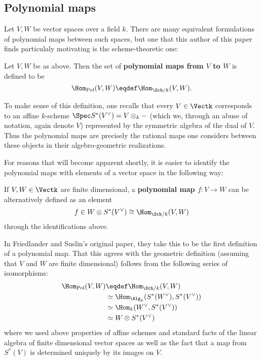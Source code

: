 \documentclass[12pt]{article}
\begin{document}
\subsection{Polynomial maps}
Let $V,W$ be vector spaces over a field $k$. There are many equivalent formulations of polynomial maps between such spaces, 
but one that this author of this paper finds particulaly motivating is the scheme-theoretic one:
\begin{defn}\label{defn:poly-maps}
	Let $V,W$ be as above. Then the set of \textbf{polynomial maps from $V$ to $W$} is defined to be 
	\[\Hom_\text{Pol}(V,W)\eqdef \Hom_{\Sch/k}(V,W).\]
\end{defn}

To make sense of this definition, one recalls that every $V\in\Vectk$ corresponds to an affine $k$-scheme 
$\Spec S^\ast(V^\vee)=V\otimes_k-$ (which we, through an abuse of notation, again denote $V$) represented by the symmetric algebra of the dual of $V$. Thus the polynomial maps
are precisely the rational maps one considers between these objects in their algebro-geometric realizations.

For reasons that will become apparent shortly, it is easier to identify the polynomial maps with elements of a vector space in the following way:
\begin{defn}
	If $V,W\in\Vectk$ are finite dimensional, a \textbf{polynomial map $f:V\to W$} can be alternatively defined as an element 
	\[f\in W\otimes S^\ast(V^\vee)\cong\Hom_{\Sch/k}(V,W)\]
	through the identifications above.
\end{defn}
\begin{rmk}
	In Friedlander and Suslin's original paper, they take this to be the first definition of a polynomial map. That this 
	agrees with the geometric definition (assuming that $V$ and $W$ are finite dimensional) follows from the following series of isomorphisms:
	\begin{align*}
		\Hom_\text{Pol}(V,W)&\eqdef\Hom_{\Sch/k}(V,W)\\
		&\simeq\Hom_{\Alg_k}(S^\ast(W^\vee),S^\ast(V^\vee))\\
		&\simeq\Hom_{k}(W^\vee,S^\ast(V^\vee))\\
		&\simeq W\otimes S^\ast(V^\vee)
	\end{align*}
	where we used above properties of affine schemes and standard facts of the linear algebra of finite dimensional vector spaces as well as the fact that 
	a map from $S^\ast(V)$ is determined uniquely by its images on $V$.
\end{rmk}
\end{document}
